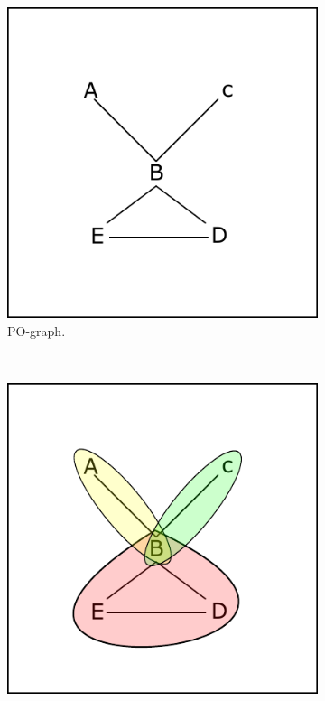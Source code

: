 \begin{figure}[htb]
\begin{subfigure}[b]{0.3\linewidth}
		\includegraphics[width=\textwidth]{figures/pipe_1.pdf}
		\caption{\ac{PO}-graph.}
		\label{fig:pipe1}
	\end{subfigure}
	~
	\begin{subfigure}[b]{0.30\linewidth}
		\includegraphics[width=\textwidth]{figures/pipe_2.pdf}

\end{subfigure}
\end{figure}
